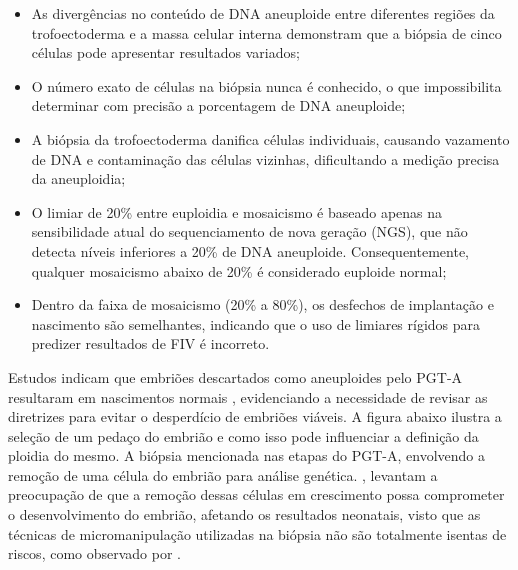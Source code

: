 \begin{itemize}
    \item As divergências no conteúdo de DNA aneuploide entre diferentes regiões da trofoectoderma e a massa celular interna demonstram que a biópsia de cinco células pode apresentar resultados variados;
    \item O número exato de células na biópsia nunca é conhecido, o que impossibilita determinar com precisão a porcentagem de DNA aneuploide;
    \item A biópsia da trofoectoderma danifica células individuais, causando vazamento de DNA e contaminação das células vizinhas, dificultando a medição precisa da aneuploidia;
    \item O limiar de 20\% entre euploidia e mosaicismo é baseado apenas na sensibilidade atual do sequenciamento de nova geração (NGS), que não detecta níveis inferiores a 20\% de DNA aneuploide. Consequentemente, qualquer mosaicismo abaixo de 20\% é considerado euploide normal;
    \item Dentro da faixa de mosaicismo (20\% a 80\%), os desfechos de implantação e nascimento são semelhantes, indicando que o uso de limiares rígidos para predizer resultados de FIV é incorreto.
\end{itemize}

Estudos indicam que embriões descartados como aneuploides pelo PGT-A resultaram em nascimentos normais \cite{gleicher2021}, evidenciando a necessidade de revisar as diretrizes para evitar o desperdício de embriões viáveis. A figura abaixo ilustra a seleção de um pedaço do embrião e como isso pode influenciar a definição da ploidia do mesmo. A biópsia mencionada nas etapas do PGT-A, envolvendo a remoção de uma célula do embrião para análise genética. , levantam a preocupação de que a remoção dessas células em crescimento possa comprometer o desenvolvimento do embrião, afetando os resultados neonatais, visto que as técnicas de micromanipulação utilizadas na biópsia não são totalmente isentas de riscos, como observado por .

